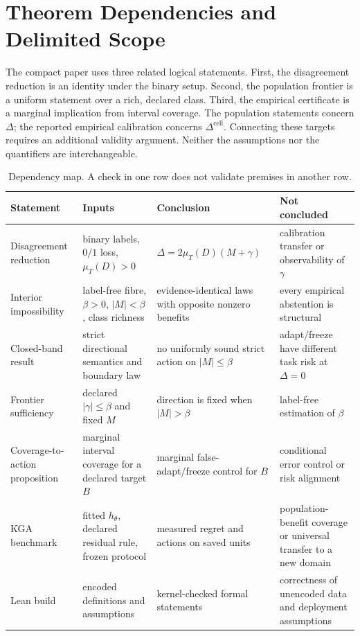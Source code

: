 \section{Theorem Dependencies and Delimited Scope}
\label{app:theorem-dependencies}

The compact paper uses three related logical statements. First, the disagreement reduction is an
identity under the binary setup. Second, the population frontier is a uniform statement over a rich,
declared class. Third, the empirical certificate is a marginal implication from interval coverage.
The population statements concern $\Delta$; the reported empirical calibration concerns
$\Delta^{\mathrm{cell}}$. Connecting these targets requires an additional validity argument.
Neither the assumptions nor the quantifiers are interchangeable.

\begin{table}[!t]
\centering
\scriptsize
\caption{Dependency map. A check in one row does not validate premises in another row.}
\label{tab:compact-dependencies}
\begin{tabular}{@{}p{}p{}p{}p{}@{}}
\toprule
Statement & Inputs & Conclusion & Not concluded \\
\midrule
Disagreement reduction & binary labels, $0/1$ loss, $\mu_T(D)>0$ & $\Delta=2\mu_T(D)(M+\gamma)$ & calibration transfer or observability of $\gamma$ \\
Interior impossibility & label-free fibre, $\beta>0$, $|M|<\beta$, class richness & evidence-identical laws with opposite nonzero benefits & every empirical abstention is structural \\
Closed-band result & strict directional semantics and boundary law & no uniformly sound strict action on $|M|\le\beta$ & adapt/freeze have different task risk at $\Delta=0$ \\
Frontier sufficiency & declared $|\gamma|\le\beta$ and fixed $M$ & direction is fixed when $|M|>\beta$ & label-free estimation of $\beta$ \\
Coverage-to-action proposition & marginal interval coverage for a declared target $B$ & marginal false-adapt/freeze control for $B$ & conditional error control or risk alignment \\
KGA benchmark & fitted $h_\theta$, declared residual rule, frozen protocol & measured regret and actions on saved units & population-benefit coverage or universal transfer to a new domain \\
Lean build & encoded definitions and assumptions & kernel-checked formal statements & correctness of unencoded data and deployment assumptions \\
\bottomrule
\end{tabular}
\end{table}

